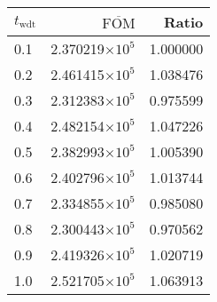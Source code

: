 \begin{tabular}{lrr}
\toprule
$t_{\mathrm{wdt}}$ & $\overline{\mathrm{FOM}}$ &    Ratio \\
\midrule
               0.1 &   2.370219$\times 10^{5}$ & 1.000000 \\
               0.2 &   2.461415$\times 10^{5}$ & 1.038476 \\
               0.3 &   2.312383$\times 10^{5}$ & 0.975599 \\
               0.4 &   2.482154$\times 10^{5}$ & 1.047226 \\
               0.5 &   2.382993$\times 10^{5}$ & 1.005390 \\
               0.6 &   2.402796$\times 10^{5}$ & 1.013744 \\
               0.7 &   2.334855$\times 10^{5}$ & 0.985080 \\
               0.8 &   2.300443$\times 10^{5}$ & 0.970562 \\
               0.9 &   2.419326$\times 10^{5}$ & 1.020719 \\
               1.0 &   2.521705$\times 10^{5}$ & 1.063913 \\
\bottomrule
\end{tabular}

